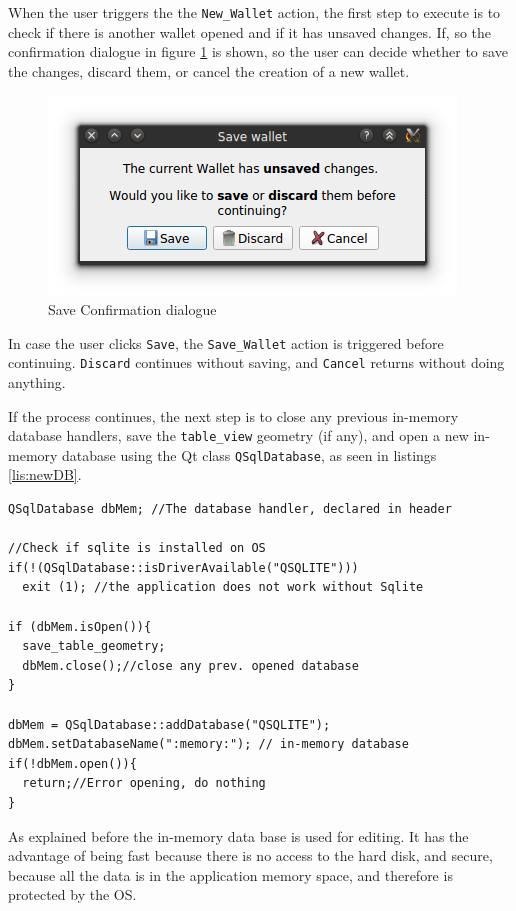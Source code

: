 When the user triggers the the \texttt{New\_Wallet} action, the first step to execute is to check if there is another wallet opened and if it has unsaved changes. If, so the confirmation dialogue in figure \ref{fig:confSave} is shown, so the user can decide whether to save the changes, discard them, or cancel the creation of a new wallet.
\begin{figure}[htb]
  \centering
  \captionsetup{justification=centering}
  \centerline{\includegraphics[width=0.6\columnwidth]{chapters/figures/development/confSave.png}}
  \caption{Save Confirmation dialogue}
  \label{fig:confSave}
\end{figure}

In case the user clicks \texttt{Save}, the \texttt{Save\_Wallet} action is triggered before continuing. \texttt{Discard} continues without saving, and \texttt{Cancel} returns without doing anything.

If the process continues, the next step is to close any previous in-memory database handlers, save the \texttt{table\_view} geometry (if any), and open a new in-memory database using the Qt class \texttt{QSqlDatabase}, as seen in listings \ref{lis:newDB}.

\begin{lstlisting}[style=customc, float=htb, caption={New in memory database}, label = {lis:newDB}]
QSqlDatabase dbMem; //The database handler, declared in header 

//Check if sqlite is installed on OS
if(!(QSqlDatabase::isDriverAvailable("QSQLITE")))
  exit (1); //the application does not work without Sqlite

if (dbMem.isOpen()){ 
  save_table_geometry;
  dbMem.close();//close any prev. opened database
}

dbMem = QSqlDatabase::addDatabase("QSQLITE");
dbMem.setDatabaseName(":memory:"); // in-memory database
if(!dbMem.open()){
  return;//Error opening, do nothing
}
\end{lstlisting}

As explained before the in-memory data base is used for editing. It has the advantage of being fast because there is no access to the hard disk, and secure, because all the data is in the application memory space, and therefore is protected by the OS.

